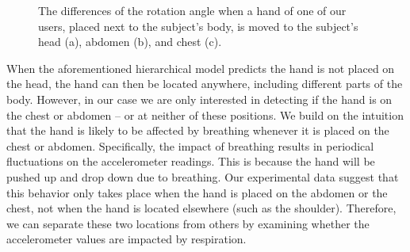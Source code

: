 \begin{figure}[!t]
	\centering
	\caption{The differences of the rotation angle when a hand of one of our users, placed next to the subject's body, is moved to the subject's head (a), abdomen (b), and chest (c). }\label{Bodyhand}
\end{figure}



 {When the aforementioned hierarchical model predicts the hand is not placed on the head, the
hand can then be located anywhere, including different parts of the body. {However, in our case we are only interested in detecting if
the hand is on the chest or abdomen -- or at neither of these positions.} We build on the intuition that the hand is likely to be affected
by breathing whenever it is placed on the chest or abdomen.} Specifically, the impact of breathing results in periodical fluctuations on
the accelerometer readings. This is because the hand will be pushed up and drop down due to breathing.  {Our experimental data suggest that
this behavior only takes place when the hand is placed on the abdomen or the chest, not when the hand is located elsewhere (such as the
shoulder). Therefore, we can separate these two locations from others by examining whether the accelerometer values are impacted by
respiration.}


